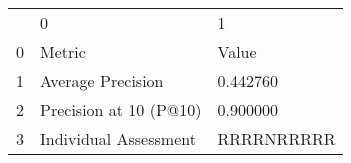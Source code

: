 \begin{tabular}{lll}
 & 0 & 1 \\
0 & Metric & Value \\
1 & Average Precision & 0.442760 \\
2 & Precision at 10 (P@10) & 0.900000 \\
3 & Individual Assessment & RRRRNRRRRR \\
\end{tabular}
